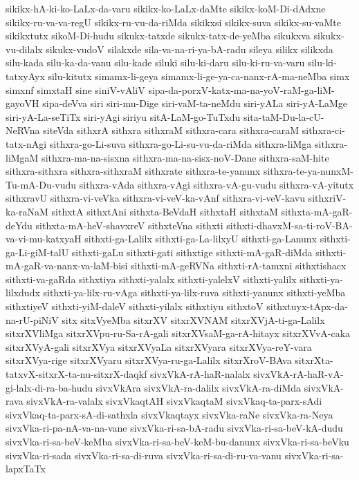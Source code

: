 {sikikx-hA-ki-ko-LaLx-da-varu
sikikx-ko-LaLx-daMte
sikikx-koM-Di-dAdxne
sikikx-ru-va-va-regU
sikikx-ru-vu-da-riMda
sikikxsi
sikikx-suva
sikikx-su-vaMte
sikikxtutx
sikoM-Di-hudu
sikukx-tatxde
sikukx-tatx-de-yeMba
sikukxva
sikukx-vu-dilalx
sikukx-vudoV
silakxde
sila-va-na-ri-ya-bA-radu
sileya
silikx
silikxda
silu-kada
silu-ka-da-vanu
silu-kade
siluki
silu-ki-daru
silu-ki-ru-va-varu
silu-ki-tatxyAyx
silu-kitutx
simamx-li-geya
simamx-li-ge-ya-ca-nanx-rA-ma-neMba
simx
simxnf
simxtaH
sine
siniV-vAliV
sipa-da-porxV-katx-ma-na-yoV-raM-ga-liM-gayoVH
sipa-deVva
siri
siri-mu-Dige
siri-vaM-ta-neMdu
siri-yALa
siri-yA-LaMge
siri-yA-La-seTiTx
siri-yAgi
siriyu
sitA-LaM-go-TuTxdu
sita-taM-Du-la-cU-NeRVna
siteVda
sithxrA
sithxra
sithxraM
sithxra-cara
sithxra-caraM
sithxra-ci-tatx-nAgi
sithxra-go-Li-suva
sithxra-go-Li-su-vu-da-riMda
sithxra-liMga
sithxra-liMgaM
sithxra-ma-na-sisxna
sithxra-ma-na-sisx-noV-Dane
sithxra-saM-hite
sithxra-sithxra
sithxra-sithxraM
sithxrate
sithxra-te-yanunx
sithxra-te-ya-nunxM-Tu-mA-Du-vudu
sithxra-vAda
sithxra-vAgi
sithxra-vA-gu-vudu
sithxra-vA-yitutx
sithxravU
sithxra-vi-veVka
sithxra-vi-veV-ka-vAnf
sithxra-vi-veV-kavu
sithxriV-ka-raNaM
sithxtA
sithxtAni
sithxta-BeVdaH
sithxtaH
sithxtaM
sithxta-mA-gaR-deYdu
sithxta-mA-heV-shavxreV
sithxteVna
sithxti
sithxti-dhavxM-sa-ti-roV-BA-va-vi-mu-katxyaH
sithxti-ga-Lalilx
sithxti-ga-La-lilxyU
sithxti-ga-Lanunx
sithxti-ga-Li-giM-talU
sithxti-gaLu
sithxti-gati
sithxtige
sithxti-mA-gaR-diMda
sithxti-mA-gaR-va-nanx-va-laM-bisi
sithxti-mA-geRVNa
sithxti-rA-tamxni
sithxtishacx
sithxti-va-gaRda
sithxtiya
sithxti-yalalx
sithxti-yalelxV
sithxti-yalilx
sithxti-ya-lilxdudx
sithxti-ya-lilx-ru-vAga
sithxti-ya-lilx-ruva
sithxti-yanunx
sithxti-yeMba
sithxtiyeV
sithxti-yiM-daleV
sithxti-yilalx
sithxtiyu
sithxtoV
sithxtuyx-tApx-da-na-rU-piNiV
sitx
sitxVyeMba
sitxrXV
sitxrXVNAM
sitxrXVjA-ti-ga-Lalilx
sitxrXVliMga
sitxrXVpu-ru-Sa-rA-gali
sitxrXVsaM-ga-rA-hitayx
sitxrXVvA-caka
sitxrXVyA-gali
sitxrXVya
sitxrXVyaLa
sitxrXVyara
sitxrXVya-reY-vara
sitxrXVya-rige
sitxrXVyaru
sitxrXVya-ru-ga-Lalilx
sitxrXroV-BAva
sitxrXta-tatxvX-sitxrX-ta-nu-sitxrX-daqkf
sivxVkA-rA-haR-nalalx
sivxVkA-rA-haR-vA-gi-lalx-di-ra-ba-hudu
sivxVkAra
sivxVkA-ra-dalilx
sivxVkA-ra-diMda
sivxVkA-rava
sivxVkA-ra-valalx
sivxVkaqtAH
sivxVkaqtaM
sivxVkaq-ta-parx-sAdi
sivxVkaq-ta-parx-sA-di-sathxla
sivxVkaqtayx
sivxVka-raNe
sivxVka-ra-Neya
sivxVka-ri-pa-nA-va-na-vane
sivxVka-ri-sa-bA-radu
sivxVka-ri-sa-beV-kA-dudu
sivxVka-ri-sa-beV-keMba
sivxVka-ri-sa-beV-keM-bu-danunx
sivxVka-ri-sa-beVku
sivxVka-ri-sada
sivxVka-ri-sa-di-ruva
sivxVka-ri-sa-di-ru-va-vanu
sivxVka-ri-sa-lapxTaTx
}
